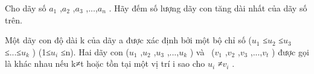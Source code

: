 Cho dãy số $a_{1}$   ,$a_{2}$   ,$a_{3}$   ,...,$a_{n}$   .  Hãy đếm số lượng dãy con tăng dài nhất của dãy số trên.  

   Một dãy  con độ dài k của dãy a được xác định bởi một bộ chỉ số ($u_{1}$   ≤$u_{2}$   ≤$u_{3}$   ≤...≤$u_{k}$   )  (1≤$u_{i}$   ≤n). Hai dãy con ($u_{1}$   ,$u_{2}$   ,$u_{3}$   ,...,$u_{k}$   )  và  ($v_{1}$   ,$v_{2}$   ,$v_{3}$   ,...,$v_{t}$   ) được  gọi là khác nhau nếu k≠t hoặc tồn tại một vị trí i sao cho $u_{i}$   ≠$v_{i}$   .